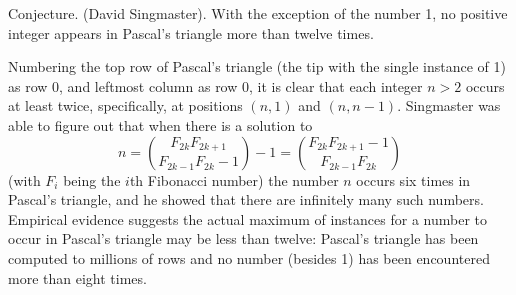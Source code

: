 \documentclass[12pt]{article}
\begin{document}
Conjecture. (David Singmaster). With the exception of the number 1, no positive integer appears in Pascal's triangle more than twelve times.

Numbering the top row of Pascal's triangle (the tip with the single instance of 1) as row 0, and leftmost column as row 0, it is clear that each integer $n > 2$ occurs at least twice, specifically, at positions $(n, 1)$ and $(n, n - 1)$. Singmaster was able to figure out that when there is a solution to $$n = { F_{2k} F_{2k + 1} \choose F_{2k - 1} F_{2k} - 1} - 1 = { F_{2k} F_{2k + 1} - 1 \choose F_{2k - 1} F_{2k}}$$ (with $F_i$ being the $i$th Fibonacci number) the number $n$ occurs six times in Pascal's triangle, and he showed that there are infinitely many such numbers. Empirical evidence suggests the actual maximum of instances for a number to occur in Pascal's triangle may be less than twelve: Pascal's triangle has been computed to millions of rows and no number (besides 1) has been encountered more than eight times.
\end{document}
